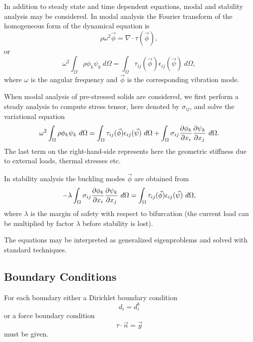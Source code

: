 In addition to steady state and time dependent equations, modal and stability analysis
may be considered. In modal analysis the Fourier transform of the homogeneous form of
the dynamical equation is
\begin{equation}
  \rho\omega^2\Vec{\phi} = \nabla\cdot\tau(\Vec{\phi}),
\end{equation}
or
\begin{equation}
\omega^2  \int_\Omega \rho \phi_k \psi_k \ d\Omega = \int_\Omega
\tau_{ij}(\Vec{\phi}) \epsilon_{ij}(\Vec{\psi}) \ d\Omega,
\end{equation}
where $\omega$ is the angular frequency and $\vec \phi$ is the corresponding
vibration mode.

When modal analysis of pre-stressed solids are considered, we first perform a steady
analysis to compute stress tensor, here denoted by $\sigma_{ij}$, and solve the
variational equation
\begin{equation}
\omega^2  \int_\Omega \rho \phi_k \psi_k \ d\Omega = \int_\Omega
\tau_{ij}(\Vec{\phi}) \epsilon_{ij}(\Vec{\psi}) \ d\Omega + \int_\Omega
\sigma_{ij}{\partial\phi_k \over \partial x_i}{\partial \psi_k\over \partial x_j} \ d\Omega.
\end{equation}
The last term on the right-hand-side represents here the geometric stiffness due to 
external loads, thermal stresses etc.

In stability analysis the buckling modes $\Vec\phi$ are obtained from
\begin{equation}
-\lambda \int_\Omega\sigma_{ij} {\partial \phi_k \over \partial x_i}{\partial \psi_k
\over \partial x_j }  \ d\Omega = 
\int_\Omega \tau_{ij}(\Vec \phi)  \epsilon_{ij}(\Vec \psi) \ d\Omega,
 \end{equation}
where $\lambda$ is the margin of safety with respect to bifurcation (the
current load can be multiplied by factor $\lambda$ before stability is lost). 

The equations may be interpreted as generalized eigenproblems and solved
with standard techniques.


\subsection{Boundary Conditions}

For each boundary either a Dirichlet boundary condition
\begin{equation}
d_i = d_i^b
\end{equation}
or a force boundary condition 
\begin{equation}
\tau\cdot\Vec{n} = \Vec{g}
\end{equation}
must be given.

